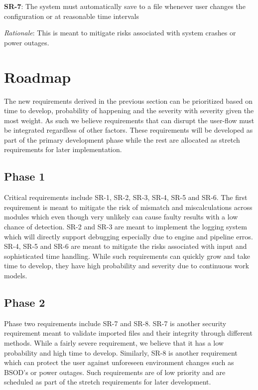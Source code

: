 \documentclass{article}
\begin{document}
\textbf{SR-7}:
The system must automatically save to a file whenever user changes the configuration or at reasonable time intervals

\emph{Rationale}: This is meant to mitigate risks associated with system crashes or power outages.\\



\section{Roadmap}

The new requirements derived in the previous section can be prioritized based on time to develop, probability of happening and the severity with severity given the most weight. As such we believe requirements that can disrupt the user-flow must be integrated regardless of other factors. These requirements will be developed as part of the primary development phase while the rest are allocated as stretch requirements for later implementation. 

\subsection{Phase 1}
Critical requirements include SR-1, SR-2, SR-3, SR-4, SR-5 and SR-6. The first requirement is meant to mitigate the risk of mismatch and miscalculations across modules which even though very unlikely can cause faulty results with a low chance of detection. SR-2 and SR-3 are meant to implement the logging system which will directly support debugging especially due to engine and pipeline erros. SR-4, SR-5 and SR-6 are meant to mitigate the risks associated with input and sophisticated time handling. While such requirements can quickly grow and take time to develop, they have high probability and severity due to continuous work models. 
\subsection{Phase 2}
Phase two requirements include SR-7 and SR-8. SR-7 is another security requirement meant to validate imported files and their integrity through different methods. While a fairly severe requirement, we believe that it has a low probability and high time to develop. Similarly, SR-8 is another requirement which can protect the user against unforeseen environment changes such as BSOD’s or power outages. Such requirements are of low priority and are scheduled as part of the stretch requirements for later development. 
\end{document}
